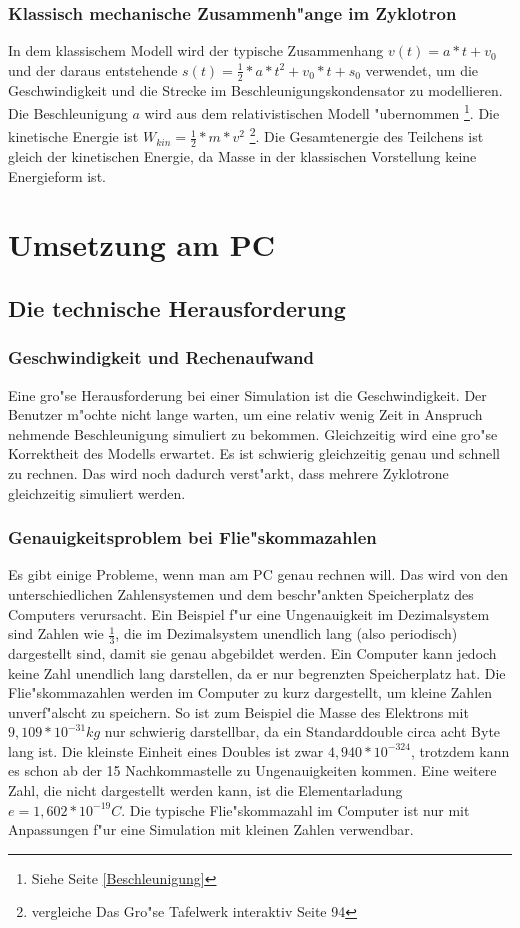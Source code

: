 \documentclass[14pt, a4paper]{report}
\begin{document}
\section{Klassisch mechanische Zusammenh"ange im Zyklotron}
In dem klassischem Modell wird der typische Zusammenhang $v(t) = a*t + v_0$ und
der daraus entstehende $s(t) = \frac{1}{2} *a *t^2 + v_0 *t + s_0$ verwendet, um die
Geschwindigkeit und die Strecke im Beschleunigungskondensator zu modellieren. Die 
Beschleunigung $a$ wird aus dem  relativistischen Modell "ubernommen 
\footnote{Siehe Seite \pageref{Beschleunigung} \ref{Beschleunigung}}. Die kinetische 
Energie ist $ W_{kin} = \frac{1}{2} * m * v^2 $ \footnote{vergleiche Das Gro"se Tafelwerk 
interaktiv Seite 94}. Die Gesamtenergie des Teilchens ist gleich der kinetischen
Energie, da Masse in der klassischen Vorstellung keine Energieform ist.

\part{Umsetzung am PC}
\chapter{Die technische Herausforderung}
\section{Geschwindigkeit und Rechenaufwand}
Eine gro"se Herausforderung bei einer Simulation ist die Geschwindigkeit. Der Benutzer
m"ochte nicht lange warten, um eine relativ wenig Zeit in Anspruch nehmende 
Beschleunigung simuliert zu bekommen. 
Gleichzeitig wird eine gro"se Korrektheit des Modells
erwartet. Es ist schwierig gleichzeitig genau und schnell zu rechnen. Das wird 
noch dadurch verst"arkt, dass mehrere Zyklotrone gleichzeitig simuliert werden.


\section{Genauigkeitsproblem bei Flie"skommazahlen}
Es gibt einige Probleme, wenn man am PC genau rechnen will. Das wird von den 
unterschiedlichen Zahlensystemen und dem beschr"ankten Speicherplatz des Computers 
verursacht. Ein Beispiel f"ur eine Ungenauigkeit im Dezimalsystem sind Zahlen
wie $\frac{1}{3}$, die im Dezimalsystem unendlich lang (also periodisch)
 dargestellt sind, damit sie genau
abgebildet werden. Ein Computer kann jedoch keine Zahl unendlich lang darstellen, da
er nur begrenzten Speicherplatz hat. Die Flie"skommazahlen werden im Computer zu kurz
dargestellt, um kleine Zahlen unverf"alscht zu speichern. So ist zum Beispiel die 
Masse des Elektrons mit $9,109 * 10^{-31} kg$ nur schwierig darstellbar, da ein 
Standarddouble circa acht Byte lang ist. Die kleinste Einheit eines Doubles ist zwar
$4,940 * 10^{-324}$, trotzdem kann es schon ab der 15 Nachkommastelle zu 
Ungenauigkeiten kommen. Eine weitere Zahl, die nicht dargestellt werden
kann, ist die Elementarladung $e = 1,602 * 10^{-19} C$. Die typische 
Flie"skommazahl im Computer ist nur mit Anpassungen f"ur eine Simulation mit kleinen
Zahlen verwendbar.
\end{document}
